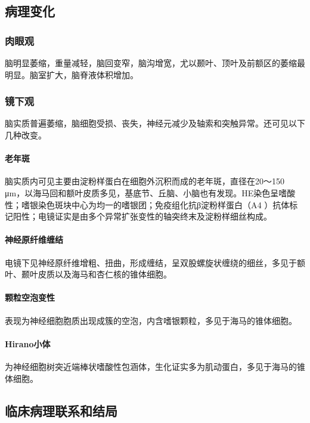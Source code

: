 \subsection{病理变化}

\subsubsection{肉眼观}

脑明显萎缩，重量减轻，脑回变窄，脑沟增宽，尤以颞叶、顶叶及前额区的萎缩最明显。脑室扩大，脑脊液体积增加。

\subsubsection{镜下观}

脑实质普遍萎缩，脑细胞受损、丧失，神经元减少及轴索和突触异常。还可见以下几种改变。

\paragraph{老年斑}
脑实质内可见主要由淀粉样蛋白在细胞外沉积而成的老年斑，直径在20～150
μm，以海马回和额叶皮质多见，基底节、丘脑、小脑也有发现。HE染色呈嗜酸性；嗜银染色斑块中心为均一的嗜银团；免疫组化抗β淀粉样蛋白（A{4}
）抗体标记阳性；电镜证实是由多个异常扩张变性的轴突终末及淀粉样细丝构成。

\paragraph{神经原纤维缠结}
电镜下见神经原纤维增粗、扭曲，形成缠结，呈双股螺旋状缠绕的细丝，多见于额叶、颞叶皮质以及海马和杏仁核的锥体细胞。

\paragraph{颗粒空泡变性}
表现为神经细胞胞质出现成簇的空泡，内含嗜银颗粒，多见于海马的锥体细胞。

\paragraph{Hirano小体}
为神经细胞树突近端棒状嗜酸性包涵体，生化证实多为肌动蛋白，多见于海马的锥体细胞。

\subsection{临床病理联系和结局}

